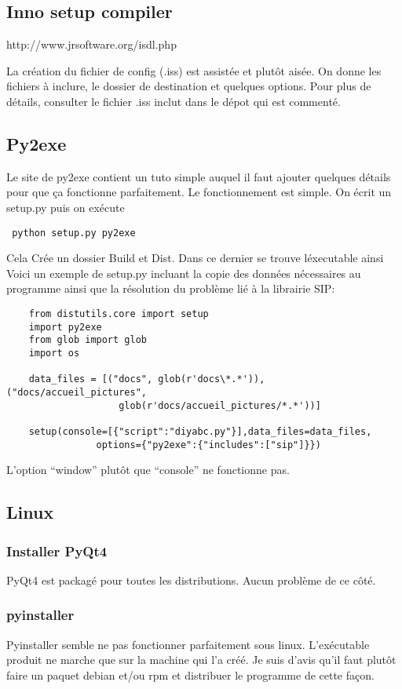 \documentclass[12pt,a4paper]{article}
\begin{document}
        \subsection{Inno setup compiler}
        http://www.jrsoftware.org/isdl.php

        La cr\'eation du fichier de config (.iss) est assist\'ee et plutôt ais\'ee. On donne les fichiers à inclure, le dossier de destination
        et quelques options. Pour plus de d\'etails, consulter le fichier .iss inclut dans le d\'epot qui est comment\'e.
        \subsection{Py2exe}
        Le site de py2exe contient un tuto simple auquel il faut ajouter quelques d\'etails pour que ça fonctionne parfaitement. Le
        fonctionnement est simple. On \'ecrit un setup.py puis on ex\'ecute \begin{verbatim} python setup.py py2exe \end{verbatim} Cela Cr\'ee un dossier 
        Build et Dist. Dans ce dernier se trouve l\'executable ainsi
        Voici un exemple de setup.py incluant la copie des donn\'ees n\'ecessaires au programme ainsi que la r\'esolution du problème
        li\'e à la librairie SIP:
        \begin{verbatim}
    from distutils.core import setup
    import py2exe
    from glob import glob
    import os

    data_files = [("docs", glob(r'docs\*.*')),("docs/accueil_pictures",
                    glob(r'docs/accueil_pictures/*.*'))]

    setup(console=[{"script":"diyabc.py"}],data_files=data_files, 
                options={"py2exe":{"includes":["sip"]}})
        \end{verbatim}
        L'option ``window'' plutôt que ``console'' ne fonctionne pas.
    \subsection{Linux}
        \subsubsection{Installer PyQt4}
        PyQt4 est packagé pour toutes les distributions. Aucun problème de ce côté.
        \subsubsection{pyinstaller}
        Pyinstaller semble ne pas fonctionner parfaitement sous linux. L'exécutable produit ne marche que
        sur la machine qui l'a créé. Je suis d'avis qu'il faut plutôt faire un paquet debian et/ou rpm
        et distribuer le programme de cette façon.
\end{document}
